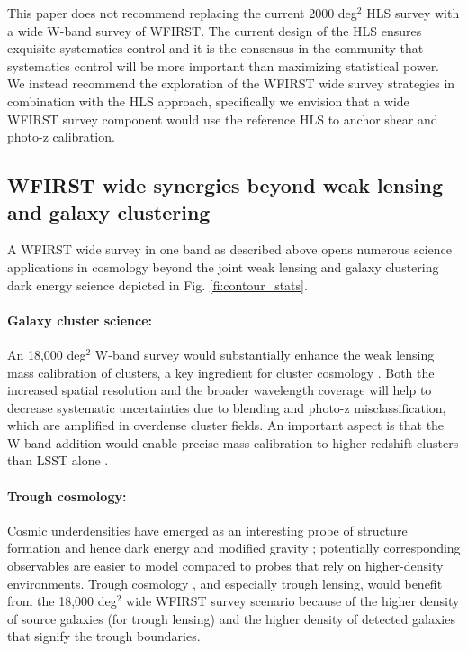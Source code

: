 \documentclass[fleqn,usenatbib,useAMS]{mnras}
\begin{document}
This paper does not recommend replacing the current 2000 deg$^2$ HLS survey with a wide W-band survey of WFIRST. The current design of the HLS ensures exquisite systematics control and it is the consensus in the community that systematics control will be more important than maximizing statistical power. We instead recommend the exploration of the WFIRST wide survey strategies in combination with the HLS approach, specifically we envision that a wide WFIRST survey component would use the reference HLS to anchor shear and photo-z calibration. 

 
\subsection{WFIRST wide synergies beyond weak lensing and galaxy clustering}

A WFIRST wide survey in one band as described above opens numerous science applications in cosmology beyond the joint weak lensing and galaxy clustering dark energy science depicted in Fig. \ref{fi:contour_stats}.  

\paragraph*{Galaxy cluster science:} An 18,000 deg$^2$ W-band survey would substantially enhance the weak lensing mass calibration of clusters, a key ingredient for cluster cosmology \citep{laa14,lma14,mla15,mbh19,crs19}.  Both the increased spatial resolution and the broader wavelength coverage will help to decrease systematic uncertainties due to blending and photo-z misclassification, which are amplified in overdense cluster fields.  An important aspect is that the W-band addition would enable precise mass calibration to higher redshift clusters  than LSST alone \citep[cf.][for a corresponding endeavor using the 100 times smaller FoV of the HST ]{sad18}.
\paragraph*{Trough cosmology:} Cosmic underdensities have emerged as an interesting probe of structure formation and hence dark energy and modified gravity \citep{kcd13,mss14,hps16,dcb19}; potentially corresponding observables are easier to model compared to probes that rely on higher-density environments. Trough cosmology \citep{gfa16,gfk18}, and especially trough lensing, would benefit from the 18,000 deg$^2$ wide WFIRST survey scenario because of the higher density of source galaxies (for trough lensing) and the higher density of detected galaxies that signify the trough boundaries. 
\end{document}
